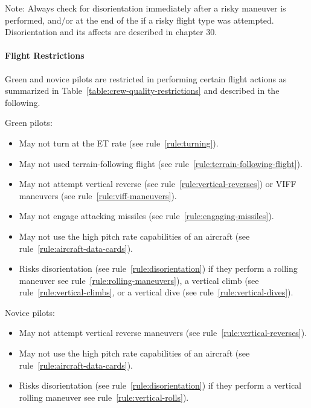 \begin{advancedrules}
{Note: Always check for disorientation immediately after a risky maneuver is performed, and/or at the end of the  if a risky flight type was attempted. Disorientation and its affects are described in chapter 30.

}{
\paragraph{Flight Restrictions}


Green and novice pilots are restricted in performing certain flight actions as summarized in Table~\ref{table:crew-quality-restrictions} and described in the following.

Green pilots:
\begin{itemize}
    \item May not turn at the ET rate (see rule~\ref{rule:turning}).
    \item May not used terrain-following flight (see rule~\ref{rule:terrain-following-flight}).
    \item May not attempt vertical reverse (see rule~\ref{rule:vertical-reverses}) or VIFF maneuvers (see rule~\ref{rule:viff-maneuvers}).
    \item May not engage attacking missiles (see rule~\ref{rule:engaging-missiles}).
    \item May not use the high pitch rate capabilities of an aircraft (see rule~\ref{rule:aircraft-data-cards}).
    \item Risks disorientation (see rule~\ref{rule:disorientation}) 
    if they perform a rolling maneuver see rule~\ref{rule:rolling-maneuvers}), a vertical climb (see rule~\ref{rule:vertical-climbs}, or a vertical dive (see rule~\ref{rule:vertical-dives}).
\end{itemize}

Novice pilots:

\begin{itemize}
    \item May not attempt vertical reverse maneuvers (see rule~\ref{rule:vertical-reverses}).
    \item May not use the high pitch rate capabilities of an aircraft (see rule~\ref{rule:aircraft-data-cards}).
   \item Risks disorientation (see rule~\ref{rule:disorientation}) 
    if they perform a vertical rolling maneuver see rule~\ref{rule:vertical-rolls}).
\end{itemize}

}
\end{advancedrules}
